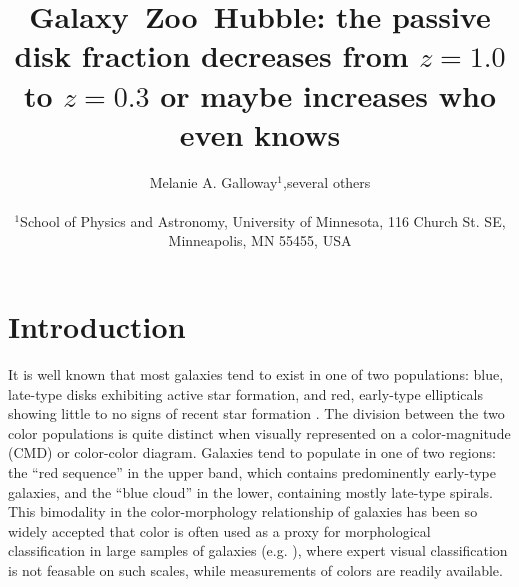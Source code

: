 \documentclass[useAMS,usenatbib]{mn2e}
\begin{document}
\title[Galaxy~Zoo: passive disk fraction]{Galaxy~Zoo~Hubble: the passive disk fraction decreases from $z=1.0$ to $z=0.3$ or maybe increases who even knows}
\author[Galloway et~al.]{\parbox[t]{16cm}{Melanie A. Galloway$^1$,several others
\vspace{0.1in} }\\
$^{1}$School of Physics and Astronomy, University of Minnesota, 116 Church St. SE, Minneapolis, MN 55455, USA\\
   }
\maketitle

\begin{abstract}


\end{abstract}

\section{Introduction}
\label{sec:Intro}

It is well known that most galaxies tend to exist in one of two populations: blue, late-type disks exhibiting active star formation, and red, early-type ellipticals showing little to no signs of recent star formation \citep{Strateva2001,Baldry2004}. The division between the two color populations is quite distinct when visually represented on a color-magnitude (CMD) or color-color diagram. Galaxies tend to populate in one of two regions: the ``red sequence'' in the upper band, which contains predominently early-type galaxies, and the ``blue cloud'' in the lower, containing mostly late-type spirals. This bimodality in the color-morphology relationship of galaxies has been so widely accepted that color is often used as a proxy for morphological classification in large samples of galaxies (e.g. \citet{Cooray2005,Lee2007,Salimbeni2008,Simon2009}), where expert visual classification is not feasable on such scales, while measurements of colors are readily available. 
\end{document}
